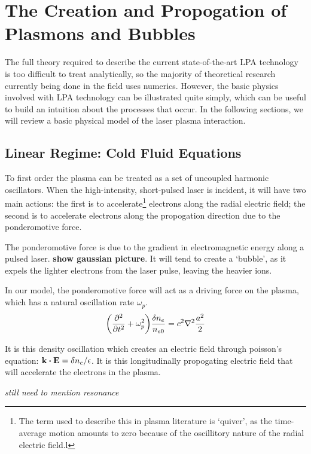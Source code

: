 \documentclass[12pt,letterpaper, titlepage]{article}
\begin{document}
\section{The Creation and Propogation of Plasmons and Bubbles}
The full theory required to describe the current state-of-the-art LPA technology 
is
too difficult to treat analytically, so the majority of theoretical research 
currently
being done in the field uses numerics. However, the basic physics involved with 
LPA technology
can be illustrated quite simply, which can be useful to build an intuition about 
the
processes that occur. In the following sections, we will review a basic physical 
model
of the laser plasma interaction.


\subsection{Linear Regime: Cold Fluid Equations}
To first order the plasma can be treated as a set of uncoupled harmonic 
oscillators. When the high-intensity, short-pulsed laser is incident, it will 
have two main actions: the first is to accelerate\footnote{The term used to 
describe this in plasma literature is `quiver', as the time-average motion 
amounts to zero because of the oscillitory nature of the radial electric 
field.l}
electrons along the radial electric field; the second is to accelerate electrons 
along the propogation direction due to the ponderomotive force. 

The ponderomotive force is due to the gradient in electromagnetic energy along a 
pulsed laser. {\bf show gaussian picture}. It will tend to create a `bubble', as 
it expels the lighter electrons from the laser pulse, leaving the heavier ions.

In our model, the ponderomotive force will act as a driving force on the plasma,
which has a natural oscillation rate $\omega_p$.  \begin{equation}
    \label{eq:linear density oscillation}
    \qty(\pdv[2]{}{t} +\omega_p^2) \frac{\delta n_e}{n_{e0}} = c^2 \laplacian{ 
    \frac{a^2}{2}}
\end{equation}

It is this density oscillation which creates an electric field through poisson's 
equation: $\vb{k}\dotproduct\vb{E} =\delta n_e/\epsilon$. It is this
longitudinally propogating electric field that will accelerate the electrons in 
the plasma.
 
{\it still need to mention resonance}
\end{document}
